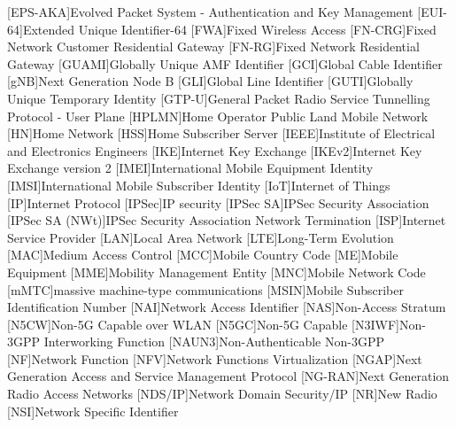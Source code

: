 \begin{multicols}{2}
\begin{acronym}[AAAAAA]
        [EPS-AKA]{Evolved Packet System - Authentication and Key Management}
        [EUI-64]{Extended Unique Identifier-64}
        [FWA]{Fixed Wireless Access}
        [FN-CRG]{Fixed Network Customer Residential Gateway}
        [FN-RG]{Fixed Network Residential Gateway}
        [GUAMI]{Globally Unique AMF Identifier}
        [GCI]{Global Cable Identifier}
        [gNB]{Next Generation Node B}
        [GLI]{Global Line Identifier}
        [GUTI]{Globally Unique Temporary Identity}
        [GTP-U]{General Packet Radio Service Tunnelling Protocol - User Plane}
        [HPLMN]{Home Operator Public Land Mobile Network}
        [HN]{Home Network}
        [HSS]{Home Subscriber Server}
        [IEEE]{Institute of Electrical and Electronics Engineers}
        [IKE]{Internet Key Exchange}
        [IKEv2]{Internet Key Exchange version 2}
        [IMEI]{International Mobile Equipment Identity}
        [IMSI]{International Mobile Subscriber Identity}
        [IoT]{Internet of Things}
        [IP]{Internet Protocol}
        [IPSec]{IP security}
        [IPSec SA]{IPSec Security Association}
        [IPSec SA (NWt)]{IPSec Security Association Network Termination}
        [ISP]{Internet Service Provider}
        [LAN]{Local Area Network}
        [LTE]{Long-Term Evolution}
        [MAC]{Medium Access Control}
        [MCC]{Mobile Country Code}
        [ME]{Mobile Equipment}
        [MME]{Mobility Management Entity}
        [MNC]{Mobile Network Code}
        [mMTC]{massive machine-type communications}
        [MSIN]{Mobile Subscriber Identification Number}
        [NAI]{Network Access Identifier}
        [NAS]{Non-Access Stratum}
        [N5CW]{Non-5G Capable over WLAN}
        [N5GC]{Non-5G Capable}
        [N3IWF]{Non-3GPP Interworking Function}
        [NAUN3]{Non-Authenticable Non-3GPP}
        [NF]{Network Function}
        [NFV]{Network Functions Virtualization}
        [NGAP]{Next Generation Access and Service Management Protocol}
        [NG-RAN]{Next Generation Radio Access Networks}
        [NDS/IP]{Network Domain Security/IP}
        [NR]{New Radio}
        [NSI]{Network Specific Identifier}

\end{acronym}
\end{multicols}
